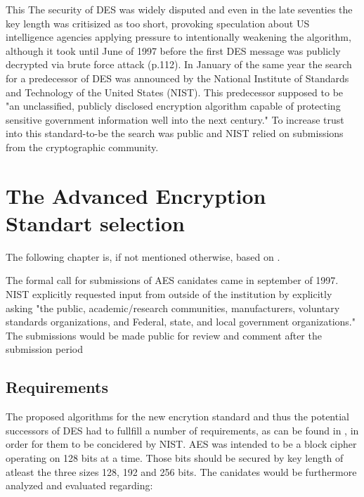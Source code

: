 This
The security of DES was widely disputed and even in the late seventies the key length was critisized as too short, provoking speculation about US intelligence agencies applying pressure to intentionally weakening the algorithm, although it took until June of 1997 before the first DES message was publicly decrypted via brute force attack (p.112). In January of the same year the search for a predecessor of DES was announced by the National Institute of Standards and Technology of the United States (NIST). This predecessor supposed to be "an unclassified, publicly disclosed encryption algorithm capable of protecting sensitive government information well into the next century." To increase trust into this standard-to-be the search was public and NIST relied on submissions from the cryptographic community. 


\section{The Advanced Encryption Standart selection}
\label{ch:aes-selection}

The following chapter is, if not mentioned otherwise, based on \cite{nistdevoverview}.

The formal call for submissions of AES canidates came in september of 1997. NIST explicitly requested input from outside of the institution by explicitly asking "the public, academic/research communities, manufacturers, voluntary standards organizations, and Federal, state, and local government organizations." The submissions would be made public for review and comment after the submission period

\subsection{Requirements}
\label{ch:requirements}

The proposed algorithms for the new encrytion standard and thus the
potential successors of DES had to fullfill a number of requirements, as can be found in \cite{announcementrequest}, in order for them to be concidered by NIST. AES was intended to be a block
cipher operating on 128 bits at a time. Those bits should be secured by
key length of atleast the three sizes 128, 192 and 256 bits. 
The canidates would be furthermore analyzed and evaluated regarding:

